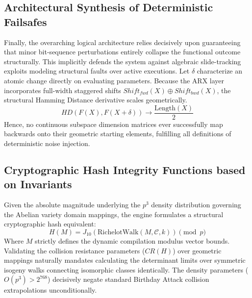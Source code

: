\subsection{Architectural Synthesis of Deterministic Failsafes}
Finally, the overarching logical architecture relies decisively upon guaranteeing that minor bit-sequence perturbations entirely collapse the functional outcome structurally. This implicitly defends the system against algebraic slide-tracking exploits modeling structural faults over active executions. Let $\delta$ characterize an atomic change directly on evaluating parameters. Because the ARX layer incorporates full-width staggered shifts $Shift_{fwd}(X) \oplus Shift_{bwd}(X)$, the structural Hamming Distance derivative scales geometrically.
\begin{equation}
    HD(F(X), F(X + \delta)) \to \frac{\text{Length}(X)}{2}
\end{equation}
Hence, no continuous subspace dimension matrices ever successfully map backwards onto their geometric starting elements, fulfilling all definitions of deterministic noise injection.

\subsection{Cryptographic Hash Integrity Functions based on Invariants}
Given the absolute magnitude underlying the $p^3$ density distribution governing the Abelian variety domain mappings, the engine formulates a structural cryptographic hash equivalent:
\begin{equation}
    H(M) = J_{10}(\text{RichelotWalk}(M, \mathcal{C}, k)) \pmod p
\end{equation}
Where $M$ strictly defines the dynamic compilation modulus vector bounds. Validating the collision resistance parameters ($CR(H)$) over geometric mappings naturally mandates calculating the determinant limits over symmetric isogeny walks connecting isomorphic classes identically. The density parameters ($O(p^3) > 2^{768}$) decisively negate standard Birthday Attack collision extrapolations unconditionally.
